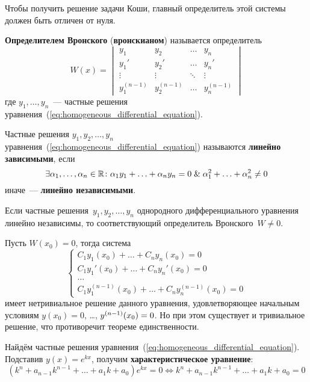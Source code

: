 Чтобы получить решение задачи Коши, главный определитель этой системы должен быть отличен от нуля.

  \textbf{Определителем Вронского} (\textbf{вронскианом}) называется определитель
\begin{equation*}
W(x) =
\begin{vmatrix}
y_1 & y_2 & \ldots & y_n \\
y_1' & y_2' & \ldots & y_n' \\
\vdots & \vdots & \ddots & \vdots \\
y_1^{(n-1)} & y_2^{(n-1)} & \ldots & y_n^{(n-1)}
\end{vmatrix}
\end{equation*}
где $y_1, \ldots, y_n$~--- частные решения уравнения~(\ref*{eq:homogeneous_differential_equation}).

Частные решения $y_1, y_2, \ldots, y_n$ уравнения~(\ref*{eq:homogeneous_differential_equation}) называются \textbf{линейно зависимыми}, если
\begin{equation*}
\exists \alpha_1, \ldots, \alpha_n \in \mathbb R \colon
\alpha_1 y_1 + \ldots + \alpha_n y_n = 0 \mathrel{\&}
\alpha_1^2 + \ldots + \alpha_n^2 \neq 0
\end{equation*}
иначе~--- \textbf{линейно независимыми}.

\begin{statement}
Если частные решения~$y_1, y_2, \ldots, y_n$ однородного дифференциального уравнения линейно независимы, то соответствующий определитель Вронского~$W \neq 0$.
\end{statement}
\begin{proofcontra}
Пусть $W(x_0) = 0$, тогда система
\begin{equation*}
\begin{cases}
C_1 y_1(x_0) + \ldots + C_n y_n(x_0) = 0 \\
C_1 y_1'(x_0) + \ldots + C_n y_n'(x_0) = 0 \\
\ldots \\
C_1 y_1^{(n-1)}(x_0) + \ldots + C_n y_n^{(n-1)}(x_0) = 0
\end{cases}
\end{equation*}
имеет нетривиальное решение данного уравнения, удовлетворяющее начальным условиям $y(x_0) = 0$, \ldots, $y^{(n-1)}(x_0) \opbr= 0$.
Но при этом существует и тривиальное решение, что противоречит теореме единственности.
\end{proofcontra}

 Найдём частные решения уравнения~(\ref*{eq:homogeneous_differential_equation}).
Подставив $y(x) = e^{kx}$, получим \textbf{характеристическое уравнение}:
\begin{equation*}
(k^n + a_{n-1} k^{n-1} + \ldots + a_1 k + a_0) e^{kx} = 0 \Leftrightarrow
k^n + a_{n-1} k^{n-1} + \ldots + a_1 k + a_0 = 0
\end{equation*}

